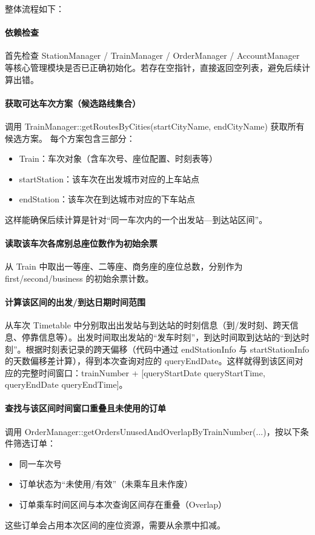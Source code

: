 \documentclass{article}
\begin{document}
	整体流程如下：
	
	\paragraph{依赖检查} 首先检查 StationManager / TrainManager / OrderManager / AccountManager 等核心管理模块是否已正确初始化。若存在空指针，直接返回空列表，避免后续计算出错。
	
	\paragraph{获取可达车次方案（候选路线集合）} 调用 TrainManager::getRoutesByCities(startCityName, endCityName) 获取所有候选方案。
	每个方案包含三部分：
	\begin{itemize}
		\item Train：车次对象（含车次号、座位配置、时刻表等）
		\item startStation：该车次在出发城市对应的上车站点
		\item endStation：该车次在到达城市对应的下车站点
	\end{itemize}
	这样能确保后续计算是针对“同一车次内的一个出发站—到达站区间”。
	
	\paragraph{读取该车次各席别总座位数作为初始余票} 从 Train 中取出一等座、二等座、商务座的座位总数，分别作为 first/second/business 的初始余票计数。
	
	\paragraph{计算该区间的出发/到达日期时间范围} 从车次 Timetable 中分别取出出发站与到达站的时刻信息（到/发时刻、跨天信息、停靠信息等）。出发时间取出发站的“发车时刻”，到达时间取到达站的“到达时刻”。根据时刻表记录的跨天偏移（代码中通过 endStationInfo 与 startStationInfo 的天数偏移差计算），得到本次查询对应的 queryEndDate。这样就得到该区间对应的完整时间窗口：trainNumber + [queryStartDate queryStartTime, queryEndDate queryEndTime]。
	
	\paragraph{查找与该区间时间窗口重叠且未使用的订单} 调用 OrderManager::getOrdersUnusedAndOverlapByTrainNumber(...)，按以下条件筛选订单：
	\begin{itemize}
		\item 同一车次号
		\item 订单状态为“未使用/有效”（未乘车且未作废）
		\item 订单乘车时间区间与本次查询区间存在重叠（Overlap）
	\end{itemize}
	这些订单会占用本次区间的座位资源，需要从余票中扣减。
	
\end{document}
